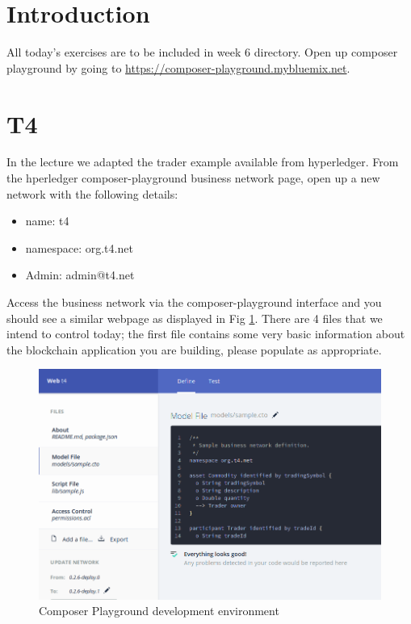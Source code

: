 \section{Introduction}
All today's exercises are to be included in week 6 directory.
Open up composer playground by going to \url{https://composer-playground.mybluemix.net}.

\section{T4}
In the lecture we adapted the trader example available from hyperledger. From the hperledger composer-playground business network page, open up a new network with the following details:
\begin{itemize}
	\item name: t4
	\item namespace: org.t4.net
	\item Admin: admin@t4.net
\end{itemize}


Access the business network via the composer-playground interface and you should see a similar webpage as displayed in Fig \ref{fi:cp}. There are 4 files that we intend to control today; the first file contains some very basic information about the blockchain application you are building, please populate as appropriate.

\begin{figure}
	\includegraphics[scale=0.5]{cp}
\caption{Composer Playground development environment}
	\label{fi:cp}
\end{figure}

